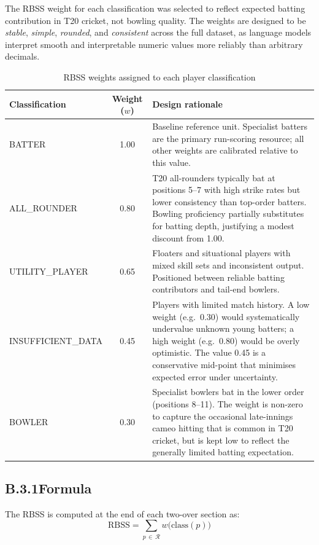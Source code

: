 The RBSS weight for each classification was selected to reflect expected batting contribution in T20 cricket, not bowling quality. The weights are designed to be \textit{stable}, \textit{simple}, \textit{rounded}, and \textit{consistent} across the full dataset, as language models interpret smooth and interpretable numeric values more reliably than arbitrary decimals.

\begin{table}[ht]
\centering
\caption{RBSS weights assigned to each player classification}
\label{tab:rbss_weights_full}
\begin{tabular}{lcp{7.5cm}}
\hline
\textbf{Classification} & \textbf{Weight ($w$)} & \textbf{Design rationale} \\
\hline
BATTER             & 1.00 & Baseline reference unit. Specialist batters are the primary run-scoring resource; all other weights are calibrated relative to this value. \\
ALL\_ROUNDER       & 0.80 & T20 all-rounders typically bat at positions 5--7 with high strike rates but lower consistency than top-order batters. Bowling proficiency partially substitutes for batting depth, justifying a modest discount from 1.00. \\
UTILITY\_PLAYER   & 0.65 & Floaters and situational players with mixed skill sets and inconsistent output. Positioned between reliable batting contributors and tail-end bowlers. \\
INSUFFICIENT\_DATA & 0.45 & Players with limited match history. A low weight (e.g.\ 0.30) would systematically undervalue unknown young batters; a high weight (e.g.\ 0.80) would be overly optimistic. The value 0.45 is a conservative mid-point that minimises expected error under uncertainty. \\
BOWLER             & 0.30 & Specialist bowlers bat in the lower order (positions 8--11). The weight is non-zero to capture the occasional late-innings cameo hitting that is common in T20 cricket, but is kept low to reflect the generally limited batting expectation. \\
\hline
\end{tabular}
\end{table}

\subsection*{B.3.1\quad Formula}

The RBSS is computed at the end of each two-over section as:
\begin{equation}
    \text{RBSS} = \sum_{p \,\in\, \mathcal{R}} w\bigl(\text{class}(p)\bigr)
\end{equation}


